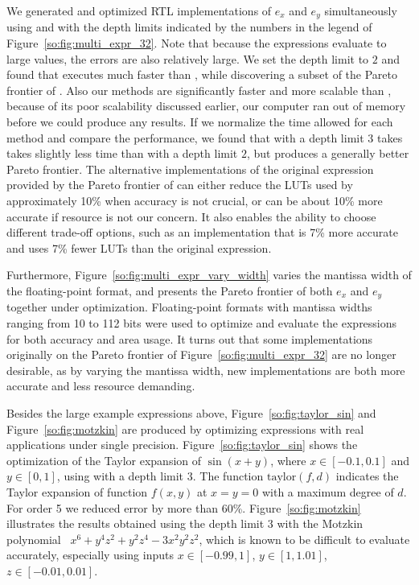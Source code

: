 We generated and optimized RTL implementations of $e_x$ and
$e_y$ simultaneously using \frontiertrace{} and \greedytrace{}
with the depth limits indicated by the numbers in the legend of
Figure~\ref{so:fig:multi_expr_32}. Note that because the expressions
evaluate to large values, the errors are also relatively large. We set the
depth limit to $2$ and found that \greedytrace{} executes much faster than
\frontiertrace{}, while discovering a subset of the Pareto frontier of
\frontiertrace{}. Also our methods are significantly faster and more scalable
than \marteltrace{}, because of its poor scalability discussed earlier, our
computer ran out of memory before we could produce any results. If we normalize
the time allowed for each method and compare the performance, we found that
\greedytrace{} with a depth limit $3$ takes takes slightly less time than
\frontiertrace{} with a depth limit $2$, but produces a generally better
Pareto frontier. The alternative implementations of the original expression
provided by the Pareto frontier of \greedytrace{} can either reduce the LUTs
used by approximately 10\% when accuracy is not crucial, or can be about 10\%
more accurate if resource is not our concern.  It also enables the ability to
choose different trade-off options, such as an implementation that is 7\% more
accurate and uses 7\% fewer LUTs than the original expression.

Furthermore, Figure~\ref{so:fig:multi_expr_vary_width} varies the mantissa
width of the floating-point format, and presents the Pareto frontier
of both $e_x$ and $e_y$ together under optimization. Floating-point
formats with mantissa widths ranging from 10 to 112 bits were used to
optimize and evaluate the expressions for both accuracy and area usage. It
turns out that some implementations originally on the Pareto frontier of
Figure~\ref{so:fig:multi_expr_32} are no longer desirable, as by varying the
mantissa width, new implementations are both more accurate and less resource
demanding.

Besides the large example expressions above, Figure~\ref{so:fig:taylor_sin}
and Figure~\ref{so:fig:motzkin} are produced by optimizing expressions with
real applications under single precision. Figure~\ref{so:fig:taylor_sin} shows
the optimization of the Taylor expansion of $\sin(x + y)$, where $x\in[-0.1,
0.1]$ and $y\in[0, 1]$, using \greedytrace{} with a depth limit $3$. The
function $\mathrm{taylor}(f, d)$ indicates the Taylor expansion of function
$f(x, y)$ at $x = y = 0$ with a maximum degree of $d$. For order 5 we reduced
error by more than 60\%. Figure~\ref{so:fig:motzkin} illustrates the results
obtained using the depth limit $3$ with the Motzkin polynomial~\cite{demmel}
$x^6 + y^4 z^2 + y^2 z^4 - 3 x^2 y^2 z^2$, which is known to be difficult to
evaluate accurately, especially using inputs $x\in[-0.99, 1]$, $y\in[1, 1.01]$,
$z\in[-0.01, 0.01]$.

